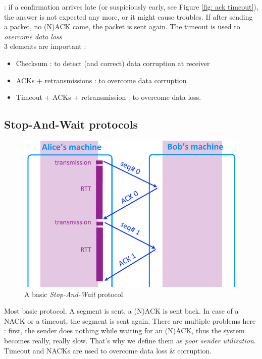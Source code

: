 \documentclass[12pt,a4paper]{article}
\begin{document}
 : if a confirmation arrives late (or suspiciously early, see Figure \ref{fig: ack timeout}), the answer is not expected any more, or it might cause troubles. If after sending a packet, no (N)ACK came, the packet is sent again. The timeout is used to \textit{overcome data loss}\\
 3 elements are important :
\begin{itemize}
	\item 	Checksum : to detect (and correct) data corruption at receiver
	\item 	ACKs + retransmissions : to overcome data corruption
	\item 	Timeout + ACKs + retransmission : to overcome data loss.
\end{itemize} 

\subsection{Stop-And-Wait protocols}
\begin{figure}[!h]
	\centering
	\includegraphics[scale=0.4]{images/stopAndWait}
	\caption{A basic \textit{Stop-And-Wait} protocol}
	\label{fig: stop and wait}
\end{figure}
Most basic protocol. A segment is sent, a (N)ACK is sent back. In case of a NACK or a timeout, the segment is sent again. There are multiple problems here : first, the sender does nothing while waiting for an (N)ACK, thus the system becomes really, really slow. That's why we define them as \textit{poor sender utilization}. Timeout and NACKs are used to overcome data loss \& corruption.
\end{document}
